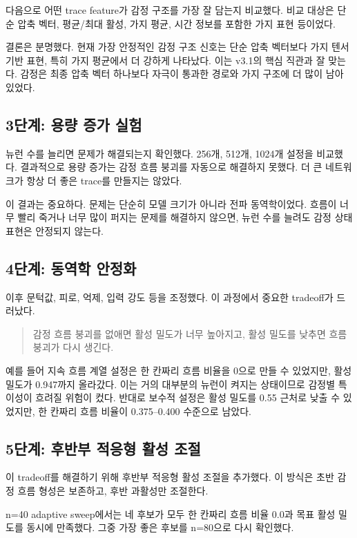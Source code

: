 \documentclass[11pt,a4paper]{article}
\begin{document}
다음으로 어떤 trace feature가 감정 구조를 가장 잘 담는지 비교했다. 비교 대상은 단순 압축 벡터, 평균/최대 활성, 가지 평균, 시간 정보를 포함한 가지 표현 등이었다.

결론은 분명했다. 현재 가장 안정적인 감정 구조 신호는 단순 압축 벡터보다 가지 텐서 기반 표현, 특히 가지 평균에서 더 강하게 나타났다. 이는 v3.1의 핵심 직관과 잘 맞는다. 감정은 최종 압축 벡터 하나보다 자극이 통과한 경로와 가지 구조에 더 많이 남아 있었다.

\subsection{3단계: 용량 증가 실험}

뉴런 수를 늘리면 문제가 해결되는지 확인했다. 256개, 512개, 1024개 설정을 비교했다. 결과적으로 용량 증가는 감정 흐름 붕괴를 자동으로 해결하지 못했다. 더 큰 네트워크가 항상 더 좋은 trace를 만들지는 않았다.

이 결과는 중요하다. 문제는 단순히 모델 크기가 아니라 전파 동역학이었다. 흐름이 너무 빨리 죽거나 너무 많이 퍼지는 문제를 해결하지 않으면, 뉴런 수를 늘려도 감정 상태 표현은 안정되지 않는다.

\subsection{4단계: 동역학 안정화}

이후 문턱값, 피로, 억제, 입력 강도 등을 조정했다. 이 과정에서 중요한 tradeoff가 드러났다.

\begin{quote}
감정 흐름 붕괴를 없애면 활성 밀도가 너무 높아지고, 활성 밀도를 낮추면 흐름 붕괴가 다시 생긴다.
\end{quote}

예를 들어 지속 흐름 계열 설정은 한 칸짜리 흐름 비율을 0으로 만들 수 있었지만, 활성 밀도가 0.947까지 올라갔다. 이는 거의 대부분의 뉴런이 켜지는 상태이므로 감정별 특이성이 흐려질 위험이 컸다. 반대로 보수적 설정은 활성 밀도를 0.55 근처로 낮출 수 있었지만, 한 칸짜리 흐름 비율이 0.375--0.400 수준으로 남았다.

\subsection{5단계: 후반부 적응형 활성 조절}

이 tradeoff를 해결하기 위해 후반부 적응형 활성 조절을 추가했다. 이 방식은 초반 감정 흐름 형성은 보존하고, 후반 과활성만 조절한다.

n=40 adaptive sweep에서는 네 후보가 모두 한 칸짜리 흐름 비율 0.0과 목표 활성 밀도를 동시에 만족했다. 그중 가장 좋은 후보를 n=80으로 다시 확인했다.
\end{document}
